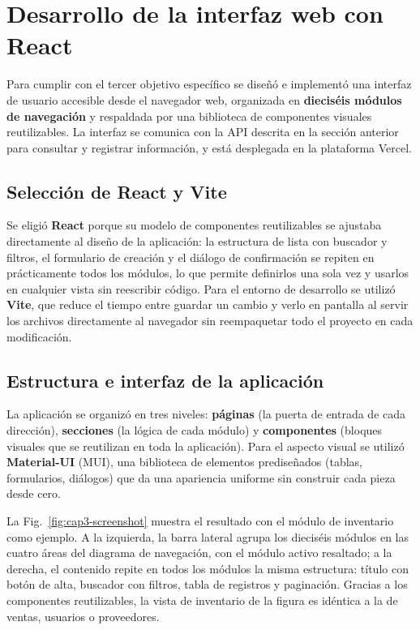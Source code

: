 
\clearpage
\section{Desarrollo de la interfaz web con React}

Para cumplir con el tercer objetivo específico se diseñó e implementó una interfaz de usuario accesible desde el navegador web, organizada en \textbf{dieciséis módulos de navegación} y respaldada por una biblioteca de componentes visuales reutilizables. La interfaz se comunica con la API descrita en la sección anterior para consultar y registrar información, y está desplegada en la plataforma Vercel.

\subsection{Selección de React y Vite}

Se eligió \textbf{React} porque su modelo de componentes reutilizables se ajustaba directamente al diseño de la aplicación: la estructura de lista con buscador y filtros, el formulario de creación y el diálogo de confirmación se repiten en prácticamente todos los módulos, lo que permite definirlos una sola vez y usarlos en cualquier vista sin reescribir código. Para el entorno de desarrollo se utilizó \textbf{Vite}, que reduce el tiempo entre guardar un cambio y verlo en pantalla al servir los archivos directamente al navegador sin reempaquetar todo el proyecto en cada modificación.

\subsection{Estructura e interfaz de la aplicación}

La aplicación se organizó en tres niveles: \textbf{páginas} (la puerta de entrada de cada dirección), \textbf{secciones} (la lógica de cada módulo) y \textbf{componentes} (bloques visuales que se reutilizan en toda la aplicación). Para el aspecto visual se utilizó \textbf{Material-UI} (MUI), una biblioteca de elementos prediseñados (tablas, formularios, diálogos) que da una apariencia uniforme sin construir cada pieza desde cero.

La Fig.~\ref{fig:cap3-screenshot} muestra el resultado con el módulo de inventario como ejemplo. A la izquierda, la barra lateral agrupa los dieciséis módulos en las cuatro áreas del diagrama de navegación, con el módulo activo resaltado; a la derecha, el contenido repite en todos los módulos la misma estructura: título con botón de alta, buscador con filtros, tabla de registros y paginación. Gracias a los componentes reutilizables, la vista de inventario de la figura es idéntica a la de ventas, usuarios o proveedores.


